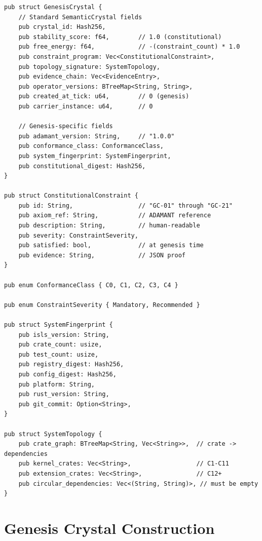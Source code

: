 \documentclass[11pt,a4paper,twoside]{article}
\theoremstyle{definition}
\theoremstyle{plain}
\theoremstyle{remark}
\begin{document}
\begin{lstlisting}[title={Genesis Crystal Structure}]
pub struct GenesisCrystal {
    // Standard SemanticCrystal fields
    pub crystal_id: Hash256,
    pub stability_score: f64,        // 1.0 (constitutional)
    pub free_energy: f64,            // -(constraint_count) * 1.0
    pub constraint_program: Vec<ConstitutionalConstraint>,
    pub topology_signature: SystemTopology,
    pub evidence_chain: Vec<EvidenceEntry>,
    pub operator_versions: BTreeMap<String, String>,
    pub created_at_tick: u64,        // 0 (genesis)
    pub carrier_instance: u64,       // 0

    // Genesis-specific fields
    pub adamant_version: String,     // "1.0.0"
    pub conformance_class: ConformanceClass,
    pub system_fingerprint: SystemFingerprint,
    pub constitutional_digest: Hash256,
}

pub struct ConstitutionalConstraint {
    pub id: String,                  // "GC-01" through "GC-21"
    pub axiom_ref: String,           // ADAMANT reference
    pub description: String,         // human-readable
    pub severity: ConstraintSeverity,
    pub satisfied: bool,             // at genesis time
    pub evidence: String,            // JSON proof
}

pub enum ConformanceClass { C0, C1, C2, C3, C4 }

pub enum ConstraintSeverity { Mandatory, Recommended }

pub struct SystemFingerprint {
    pub isls_version: String,
    pub crate_count: usize,
    pub test_count: usize,
    pub registry_digest: Hash256,
    pub config_digest: Hash256,
    pub platform: String,
    pub rust_version: String,
    pub git_commit: Option<String>,
}

pub struct SystemTopology {
    pub crate_graph: BTreeMap<String, Vec<String>>,  // crate -> dependencies
    pub kernel_crates: Vec<String>,                  // C1-C11
    pub extension_crates: Vec<String>,               // C12+
    pub circular_dependencies: Vec<(String, String)>, // must be empty
}
\end{lstlisting}


\section{Genesis Crystal Construction}\label{sec:construction}
\end{document}
